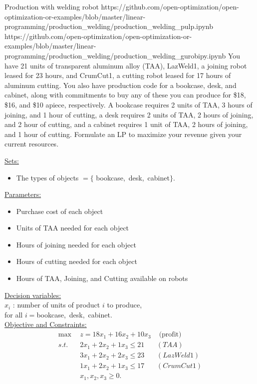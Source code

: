 \begin{examplewithallcode}{Production with welding robot}
{}
{https://github.com/open-optimization/open-optimization-or-examples/blob/master/linear-programming/production_welding/production_welding_pulp.ipynb}
{https://github.com/open-optimization/open-optimization-or-examples/blob/master/linear-programming/production_welding/production_welding_gurobipy.ipynb}
You have 21 units of transparent aluminum alloy (TAA), LazWeld1, a joining robot leased for 23 hours, and CrumCut1, a cutting robot leased for 17 hours of aluminum cutting. You also have production code for a bookcase, desk, and cabinet, along with commitments to buy any of these you can produce for \$18,  \$16, and  \$10 apiece, respectively.  A bookcase requires 2 units of TAA, 3 hours of joining, and 1 hour of cutting, a desk requires 2 units of TAA, 2 hours of joining, and 2 hour of cutting, and a cabinet requires 1 unit of TAA, 2 hours of joining, and 1 hour of cutting. Formulate an LP to maximize your revenue given your current resources.


\begin{solution}

\noindent\medskip \underline{Sets:}
\begin{itemize}
\item The types of objects $ = \{$ bookcase,~desk,~cabinet$\}$.
\end{itemize}
\medskip \underline{Parameters:} 
\begin{itemize}
\item Purchase cost of each object
\item Units of TAA needed for each object
\item Hours of joining needed for each object
\item Hours of cutting needed for each object
\item Hours of TAA, Joining, and Cutting available on robots
\end{itemize}

\noindent\medskip \underline{Decision variables:} \\
$x_i$ : number of units of product $i$ to produce, \\
for all $ i = $bookcase,~desk,~cabinet.\\

\noindent \medskip \underline{Objective and Constraints:}
\begin{align*}
\max \ \ & z = 18x_1 + 16x_2 + 10x_3  & \text{ (profit)}\\
s.t. \ \ & 2x_1 + 2x_2 + 1x_3 \le 21 & (TAA) \\
& 3x_1 + 2x_2 + 2x_3 \le 23 & (LazWeld1) \\
&  1x_1 + 2x_2 + 1x_3 \le 17 & (CrumCut1)  \\
& x_1, x_2, x_3 \ge 0.
\end{align*}
\end{solution}
\end{examplewithallcode}
    